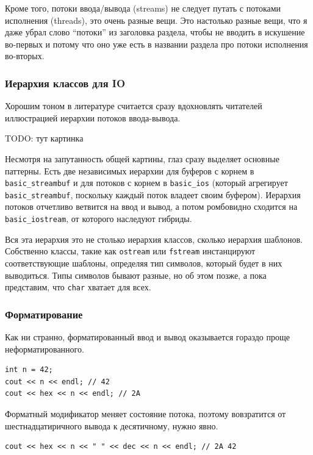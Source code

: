 \documentclass[a4paper,12pt,oneside]{article}
\begin{document}
Кроме того, потоки ввода/вывода (streams) не следует путать с потоками исполнения (threads), это очень разные вещи. Это настолько разные вещи, что я даже убрал слово ``потоки'' из заголовка раздела, чтобы не вводить в искушение во-первых и потому что оно уже есть в названии раздела про потоки исполнения во-вторых.

\subsubsection{Иерархия классов для IO}

Хорошим тоном в литературе считается сразу вдохновлять читателей иллюстрацией иерархии потоков ввода-вывода.

TODO: тут картинка

Несмотря на запутанность общей картины, глаз сразу выделяет основные паттерны. Есть две независимых иерархии для буферов с корнем в \lstinline!basic_streambuf! и для потоков с корнем в \lstinline!basic_ios! (который агрегирует \lstinline!basic_streambuf!, поскольку каждый поток владеет своим буфером). Иерархия потоков отчетливо ветвится на ввод и вывод, а потом ромбовидно сходится на \lstinline!basic_iostream!, от которого наследуют гибриды.

Вся эта иерархия это не столько иерархия классов, сколько иерархия шаблонов. Собственно классы, такие как \lstinline!ostream! или \lstinline!fstream! инстанцируют соответствующие шаблоны, определяя тип символов, который будет в них выводиться. Типы символов бывают разные, но об этом позже, а пока представим, что \lstinline!char! хватает для всех.

\subsubsection{Форматирование}\label{FormattedIO}

Как ни странно, форматированный ввод и вывод оказывается гораздо проще неформатированного.

\begin{lstlisting}
int n = 42;
cout << n << endl; // 42
cout << hex << n << endl; // 2A
\end{lstlisting}

Форматный модификатор меняет состояние потока, поэтому вовзратится от шестнадцатиричного вывода к десятичному, нужно явно.

\begin{lstlisting}
cout << hex << n << " " << dec << n << endl; // 2A 42
\end{lstlisting}
\end{document}
